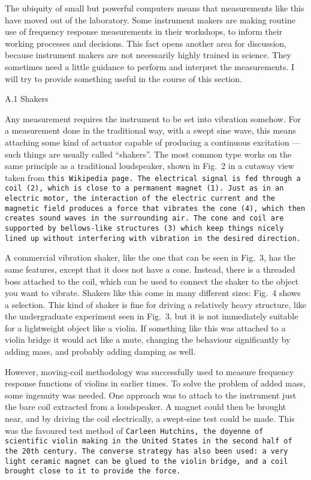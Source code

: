   The ubiquity of small but powerful computers means that measurements like 
  this have moved out of the laboratory. Some instrument makers are making 
  routine use of frequency response measurements in their workshops, to inform 
  their working processes and decisions. This fact opens another area for 
  discussion, because instrument makers are not necessarily highly trained in 
  science. They sometimes need a little guidance to perform and interpret the 
  measurements. I will try to provide something useful in the course of this 
  section. 


  A.1 Shakers 

  Any measurement requires the instrument to be set into vibration somehow. For 
  a measurement done in the traditional way, with a swept sine wave, this means 
  attaching some kind of actuator capable of producing a continuous excitation 
  — such things are usually called “shakers”. The most common type works on the 
  same principle as a traditional loudspeaker, shown in Fig.\ 2 in a cutaway 
  view taken from \tt{}this Wikipedia page\rm{}. The electrical signal is fed 
  through a coil (2), which is close to a permanent magnet (1). Just as in an 
  electric motor, the interaction of the electric current and the magnetic 
  field produces a force that vibrates the cone (4), which then creates sound 
  waves in the surrounding air. The cone and coil are supported by bellows-like 
  structures (3) which keep things nicely lined up without interfering with 
  vibration in the desired direction. 

  A commercial vibration shaker, like the one that can be seen in Fig.\ 3, has 
  the same features, except that it does not have a cone. Instead, there is a 
  threaded boss attached to the coil, which can be used to connect the shaker 
  to the object you want to vibrate. Shakers like this come in many different 
  sizes: Fig.\ 4 shows a selection. This kind of shaker is fine for driving a 
  relatively heavy structure, like the undergraduate experiment seen in Fig.\ 
  3, but it is not immediately suitable for a lightweight object like a violin. 
  If something like this was attached to a violin bridge it would act like a 
  mute, changing the behaviour significantly by adding mass, and probably 
  adding damping as well. 

  However, moving-coil methodology was successfully used to measure frequency 
  response functions of violins in earlier times. To solve the problem of added 
  mass, some ingenuity was needed. One approach was to attach to the instrument 
  just the bare coil extracted from a loudspeaker. A magnet could then be 
  brought near, and by driving the coil electrically, a swept-sine test could 
  be made. This was the favoured test method of \tt{}Carleen Hutchins\rm{}, the 
  doyenne of scientific violin making in the United States in the second half 
  of the 20th century. The converse strategy has also been used: a very light 
  ceramic magnet can be glued to the violin bridge, and a coil brought close to 
  it to provide the force. 

